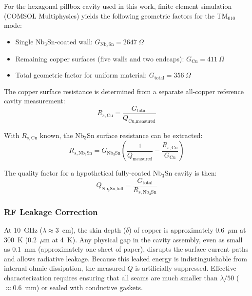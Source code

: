    For the hexagonal pillbox cavity used in this work, finite element simulation (COMSOL Multiphysics) yields the following geometric factors for the TM$_{010}$ mode:
    \begin{itemize}
        \item Single Nb$_3$Sn-coated wall: $G_{\text{Nb}_3\text{Sn}} = 2647~\Omega$
        \item Remaining copper surfaces (five walls and two endcaps): $G_\text{Cu} = 411~\Omega$
        \item Total geometric factor for uniform material: $G_\text{total} = 356~\Omega$
    \end{itemize}
    
    The copper surface resistance is determined from a separate all-copper reference cavity measurement:
    \begin{equation}
        R_{s,\text{Cu}} = \frac{G_\text{total}}{Q_\text{Cu,measured}}
        \label{eq:Rs_Cu}
    \end{equation}
    
    With $R_{s,\text{Cu}}$ known, the Nb$_3$Sn surface resistance can be extracted:
    \begin{equation}
        R_{s,\text{Nb}_3\text{Sn}} = G_{\text{Nb}_3\text{Sn}} \left(\frac{1}{Q_\text{measured}} - \frac{R_{s,\text{Cu}}}{G_\text{Cu}}\right)
        \label{eq:Rs_Nb3Sn}
    \end{equation}
    
    The quality factor for a hypothetical fully-coated Nb$_3$Sn cavity is then:
    \begin{equation}
        Q_{\text{Nb}_3\text{Sn,full}} = \frac{G_\text{total}}{R_{s,\text{Nb}_3\text{Sn}}}
        \label{eq:Q_full}
    \end{equation}
    
    \subsubsection{RF Leakage Correction}\label{sec:QRFleakage}

    At 10~GHz ($\lambda \approx 3$~cm), the skin depth ($\delta$) of copper is approximately 0.6~$\mu$m at 300~K (0.2~$\mu$m at 4~K). Any physical gap in the cavity assembly, even as small as 0.1~mm (approximately one sheet of paper), disrupts the surface current paths and allows radiative leakage. Because this leaked energy is indistinguishable from internal ohmic dissipation, the measured $Q$ is artificially suppressed. Effective characterization requires ensuring that all seams are much smaller than $\lambda/50$ ($\approx 0.6$~mm) or sealed with conductive gaskets.

